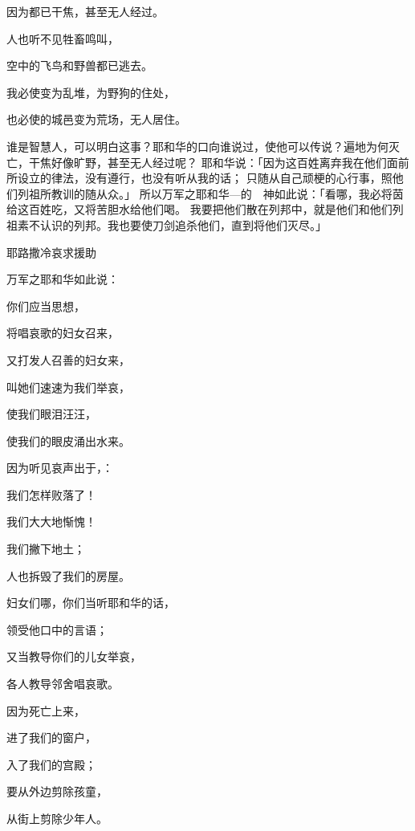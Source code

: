 {\par }{\Q 因为都已干焦，甚至无人经过。
\par }{\Q 人也听不见牲畜鸣叫，
\par }{\Q 空中的飞鸟和{}野兽都已逃去。
\par }{\Q {}我必使{}变为乱堆，为野狗的住处，
\par }{\Q 也必使{}的城邑变为荒场，无人居住。
\par }{\PP {}谁是智慧人，可以明白这事？耶和华的口向谁说过，使他可以传说？遍地为何灭亡，干焦好像旷野，甚至无人经过呢？
耶和华说：「因为这百姓离弃我在他们面前所设立的律法，没有遵行，也没有听从我的话；
只随从自己顽梗的心行事，照他们列祖所教训的随从众{}。」
所以万军之耶和华—{}的　神如此说：「看哪，我必将茵 给这百姓吃，又将苦胆水给他们喝。
我要把他们散在列邦中，就是他们和他们列祖素不认识的列邦。我也要使刀剑追杀他们，直到将他们灭尽。」
\par }{\SH 耶路撒冷哀求援助
\par }{\Q {}万军之耶和华如此说：
\par }{\Q 你们应当思想，
\par }{\Q 将{}唱哀歌的妇女召来，
\par }{\Q 又打发人召善{}的妇女来，
\par }{\Q {}叫她们速速为我们举哀，
\par }{\Q 使我们眼泪汪汪，
\par }{\Q 使我们的眼皮涌出水来。
\par }{\Q {}因为听见哀声出于{}，{}：
\par }{\Q 我们怎样败落了！
\par }{\Q 我们大大地惭愧！
\par }{\Q 我们撇下地土；
\par }{\Q 人也拆毁了我们的房屋。
\par }{\BB \par }{\Q {}妇女们哪，你们当听耶和华的话，
\par }{\Q 领受他口中的言语；
\par }{\Q 又当教导你们的儿女举哀，
\par }{\Q 各人教导邻舍唱哀歌。
\par }{\Q {}因为死亡上来，
\par }{\Q 进了我们的窗户，
\par }{\Q 入了我们的宫殿；
\par }{\Q 要从外边剪除孩童，
\par }{\Q 从街上剪除少年人。
}
